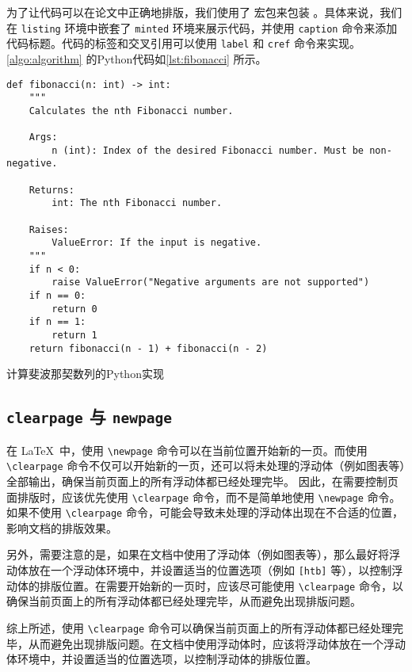 为了让代码可以在论文中正确地排版，我们使用了  宏包来包装 。具体来说，我们在 \texttt{listing} 环境中嵌套了 \texttt{minted} 环境来展示代码，并使用 \texttt{caption} 命令来添加代码标题。代码的标签和交叉引用可以使用 \texttt{label} 和 \texttt{cref} 命令来实现。
\cref{algo:algorithm} 的Python代码如\cref{lst:fibonacci} 所示。

\begin{listing}[!htb]
  \begin{verbatim}
def fibonacci(n: int) -> int:
    """
    Calculates the nth Fibonacci number.

    Args:
        n (int): Index of the desired Fibonacci number. Must be non-negative.

    Returns:
        int: The nth Fibonacci number.

    Raises:
        ValueError: If the input is negative.
    """
    if n < 0:
        raise ValueError("Negative arguments are not supported")
    if n == 0:
        return 0
    if n == 1:
        return 1
    return fibonacci(n - 1) + fibonacci(n - 2)
  \end{verbatim}
  \caption{计算斐波那契数列的Python实现}\label{lst:fibonacci}
\end{listing}

\subsection{\texttt{clearpage} 与 \texttt{newpage}}

在 \LaTeX\ 中，使用 \verb|\newpage| 命令可以在当前位置开始新的一页。而使用 \verb|\clearpage| 命令不仅可以开始新的一页，还可以将未处理的浮动体（例如图表等）全部输出，确保当前页面上的所有浮动体都已经处理完毕。
因此，在需要控制页面排版时，应该优先使用 \verb|\clearpage| 命令，而不是简单地使用 \verb|\newpage| 命令。如果不使用 \verb|\clearpage| 命令，可能会导致未处理的浮动体出现在不合适的位置，影响文档的排版效果。

另外，需要注意的是，如果在文档中使用了浮动体（例如图表等），那么最好将浮动体放在一个浮动体环境中，并设置适当的位置选项（例如 \verb|[htb]| 等），以控制浮动体的排版位置。在需要开始新的一页时，应该尽可能使用 \verb|\clearpage| 命令，以确保当前页面上的所有浮动体都已经处理完毕，从而避免出现排版问题。

综上所述，使用 \verb|\clearpage| 命令可以确保当前页面上的所有浮动体都已经处理完毕，从而避免出现排版问题。在文档中使用浮动体时，应该将浮动体放在一个浮动体环境中，并设置适当的位置选项，以控制浮动体的排版位置。